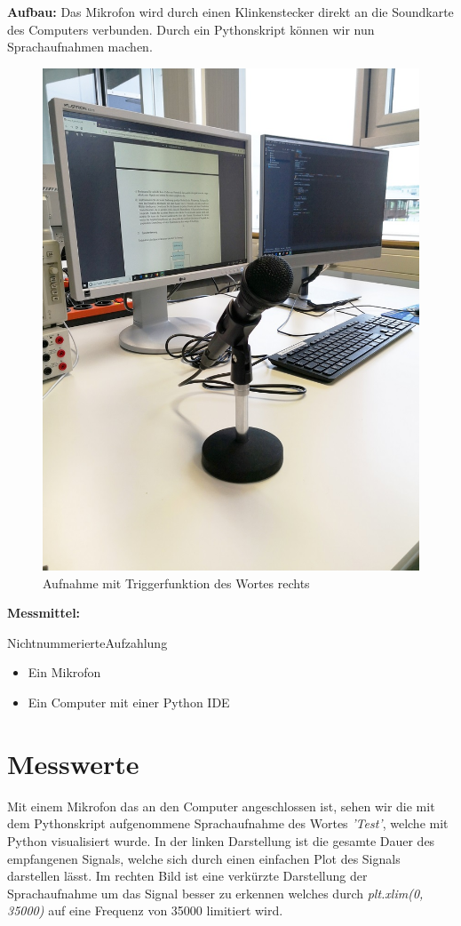 \documentclass[12pt, oneside, a4paper, \docLanguage]{report}
\begin{document}
\newline
\newline
\textbf{Aufbau:}
\newline
Das Mikrofon wird durch einen Klinkenstecker direkt an die Soundkarte des Computers verbunden.
Durch ein Pythonskript können wir nun Sprachaufnahmen machen.
\begin{figure}[H]
	\centering
	\includegraphics[width=.5\linewidth]{media/aufbau.jpg}
	\caption{Aufnahme mit Triggerfunktion des Wortes rechts}
	\label{img:Aufnahme mit Triggerfunktion des Wortes rechts}
\end{figure}
\newpage
\textbf{Messmittel:}
\item[NichtnummerierteAufzahlung]~\par
   \begin{itemize}
      \item Ein Mikrofon
      \item Ein Computer mit einer Python IDE
   \end{itemize}
\newpage
\section{Messwerte}
\label{chap:VERSUCH_1_MESSWERTE}
Mit einem Mikrofon das an den Computer angeschlossen ist, sehen wir die mit dem Pythonskript aufgenommene Sprachaufnahme des Wortes \textit{'Test'}, welche mit Python visualisiert wurde.
\newline
In der linken Darstellung ist die gesamte Dauer des empfangenen Signals, welche sich durch einen einfachen Plot des Signals darstellen lässt.
\newline
Im rechten Bild ist eine verkürzte Darstellung der Sprachaufnahme um das Signal besser zu erkennen welches durch \textit{plt.xlim(0, 35000)} auf eine Frequenz von 35000 limitiert wird.
\end{document}
